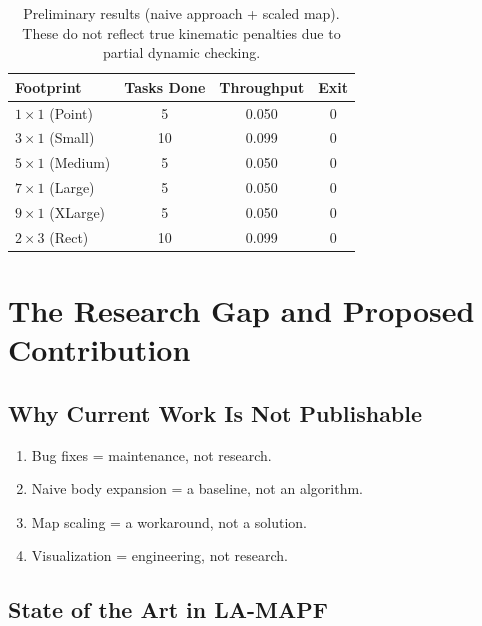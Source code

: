 \documentclass[12pt, a4paper]{article}
\begin{document}
\begin{table}[H]
\centering
\begin{tabular}{@{}lccc@{}}
\toprule
\textbf{Footprint} & \textbf{Tasks Done} & \textbf{Throughput} & \textbf{Exit} \\
\midrule
$1\times1$ (Point)   & 5  & 0.050 & 0 \\
$3\times1$ (Small)   & 10 & 0.099 & 0 \\
$5\times1$ (Medium)  & 5  & 0.050 & 0 \\
$7\times1$ (Large)   & 5  & 0.050 & 0 \\
$9\times1$ (XLarge)  & 5  & 0.050 & 0 \\
$2\times3$ (Rect)    & 10 & 0.099 & 0 \\
\bottomrule
\end{tabular}
\caption{Preliminary results (naive approach + scaled map). These do not reflect true kinematic penalties due to partial dynamic checking.}
\end{table}

\section{The Research Gap and Proposed Contribution}
\label{sec:research}

\subsection{Why Current Work Is Not Publishable}
\begin{enumerate}
    \item Bug fixes = maintenance, not research.
    \item Naive body expansion = a baseline, not an algorithm.
    \item Map scaling = a workaround, not a solution.
    \item Visualization = engineering, not research.
\end{enumerate}

\subsection{State of the Art in LA-MAPF}
\end{document}
